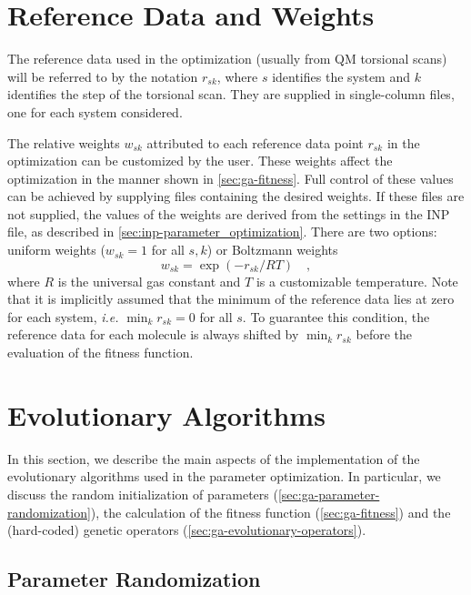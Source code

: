 \documentclass[10pt,a4paper,openany]{memoir}
\numberwithin{equation}{section}
\begin{document}
\section{Reference Data and Weights}
\label{sec:ga-fitness-wei}

The reference data used in the optimization (usually from QM torsional
scans) will be referred to by the notation $r_{sk}$, where $s$
identifies the system and $k$ identifies the step of the torsional
scan.  They are supplied in single-column files, one for each system
considered.

The relative weights $w_{sk}$ attributed to each reference data point
$r_{sk}$ in the optimization can be customized by the user.  These
weights affect the optimization in the manner shown in \autoref{sec:ga-fitness}.
Full control of these values can be achieved by
supplying files containing the desired weights. If these files are not supplied, the values
of the weights are derived from the settings in the INP file, as
described in \autoref{sec:inp-parameter_optimization}.  There are two
options: uniform weights ($w_{sk} = 1$ for all $s,k$) or Boltzmann
weights
\begin{equation*}
  w_{sk} = \exp{(-r_{sk}/RT)} \quad , 
\end{equation*}
where $R$ is the universal gas constant and $T$ is a customizable
temperature.  Note that it is implicitly assumed that the minimum of
the reference data lies at zero for each system, \textit{i.e.}
$\min_k{r_{sk}} = 0$ for all $s$.  To guarantee this condition, the
reference data for each molecule is always shifted by $\min_k{r_{sk}}$
before the evaluation of the fitness function.

\section{Evolutionary Algorithms}
\label{sec:ga}

In this section, we describe the main aspects of the implementation of
the evolutionary algorithms used in the parameter optimization.  In
particular, we discuss the random initialization of parameters
(\autoref{sec:ga-parameter-randomization}), the calculation of the
fitness function (\autoref{sec:ga-fitness}) and the (hard-coded)
genetic operators (\autoref{sec:ga-evolutionary-operators}).

\subsection{Parameter Randomization}
\label{sec:ga-parameter-randomization}
\end{document}
